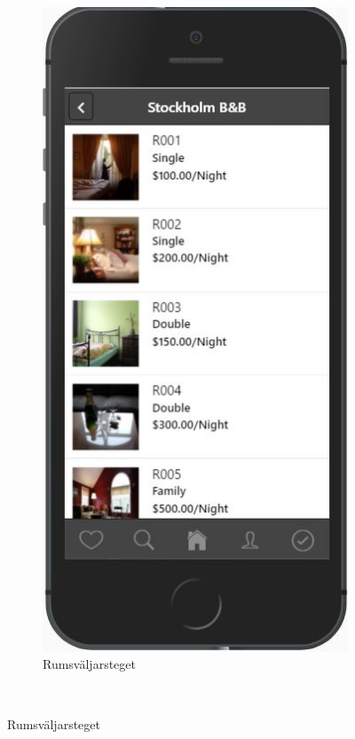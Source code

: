 \documentclass[a4paper]{article}
\begin{document}
\begin{figure}
\begin{subfigure}{.3\textwidth}
  \includegraphics[width=.8\linewidth]{rooms.jpg}
  \caption{Rumsväljarsteget}
  \label{fig:sfig3}
\end{subfigure}\\



\end{figure}
\end{document}
